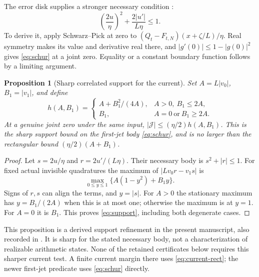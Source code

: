 \documentclass[11pt]{article}
\numberwithin{equation}{section}
\newtheorem{proposition}[theorem]{Proposition}
\theoremstyle{definition}
\theoremstyle{remark}
\newcommand{\JJ}{\mathcal J}
\begin{document}
The error disk supplies a stronger necessary condition
\cite{schur,torus}:
\begin{equation}
 \left(\frac{2u}{\eta}\right)^2+\frac{2|u'|}{L\eta}\le1.
 \label{eq:schur}
\end{equation}
To derive it, apply Schwarz--Pick at zero to
$(Q_t-F_{t,N})(x+\zeta/L)/\eta$. Real symmetry makes its value
and derivative real there, and $|g'(0)|\le1-|g(0)|^2$ gives
\eqref{eq:schur} at a joint zero. Equality or a constant boundary
function follows by a limiting argument.

\begin{proposition}[Sharp correlated support for the current]
\label{prop:curved-current}
Set $A=L|v_0|$, $B_1=|v_1|$, and define
\begin{equation}
 h(A,B_1)=
 \begin{cases}
 A+B_1^2/(4A),&A>0,\ B_1\le2A,\\
 B_1,&A=0\ \text{or}\ B_1\ge2A.
 \end{cases}
 \label{eq:support}
\end{equation}
At a genuine joint zero under the same input,
$|\JJ|\le(\eta/2)h(A,B_1)$. This is the sharp support bound on
the first-jet body \eqref{eq:schur}, and is no larger than the
rectangular bound $(\eta/2)(A+B_1)$.
\end{proposition}
\begin{proof}
Let $s=2u/\eta$ and $r=2u'/(L\eta)$. Their necessary body is
$s^2+|r|\le1$. For fixed actual invisible quadratures the maximum of
$|Lv_0r-v_1s|$ is
\[
 \max_{0\le y\le1}\{A(1-y^2)+B_1y\}.
\]
Signs of $r,s$ can align the terms, and $y=|s|$.
For $A>0$ the stationary maximum has $y=B_1/(2A)$ when this is
at most one; otherwise the maximum is at $y=1$. For $A=0$ it is
$B_1$. This proves \eqref{eq:support}, including both degenerate cases.
\end{proof}
This proposition is a derived support refinement in the present
manuscript, also recorded in \cite{micro6}. It is sharp for the stated necessary body, not a
characterization of realizable arithmetic states. None of the retained
certificates below requires this sharper current test. A finite current
margin there uses \eqref{eq:current-rect}; the newer first-jet predicate
uses \eqref{eq:schur} directly.
\end{document}
